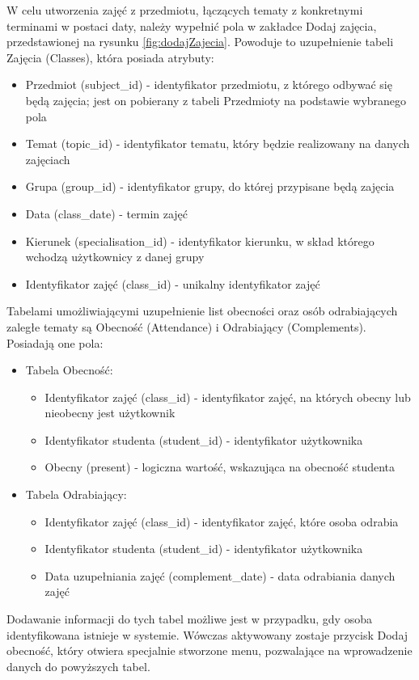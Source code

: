 W celu utworzenia zajęć z przedmiotu, łączących tematy z konkretnymi terminami w postaci daty, należy wypełnić pola w zakładce Dodaj zajęcia, przedstawionej na rysunku \ref{fig:dodajZajecia}. Powoduje to uzupełnienie tabeli Zajęcia (Classes), która posiada atrybuty:
\begin{itemize}
\item Przedmiot (subject\_id) - identyfikator przedmiotu, z którego odbywać się będą zajęcia; jest on pobierany z tabeli Przedmioty na podstawie wybranego pola
\item Temat (topic\_id) - identyfikator tematu, który będzie realizowany na danych zajęciach
\item Grupa (group\_id) - identyfikator grupy, do której przypisane będą zajęcia
\item Data (class\_date) - termin zajęć
\item Kierunek (specialisation\_id) - identyfikator kierunku, w skład którego wchodzą użytkownicy z danej grupy
\item Identyfikator zajęć (class\_id) - unikalny identyfikator zajęć
\end{itemize}
Tabelami umożliwiającymi uzupełnienie list obecności oraz osób odrabiających zaległe tematy są Obecność (Attendance) i Odrabiający (Complements). Posiadają one pola:
\begin{itemize}
\item Tabela Obecność:
\begin{itemize}
\item Identyfikator zajęć (class\_id) - identyfikator zajęć, na których obecny lub nieobecny jest użytkownik
\item Identyfikator studenta (student\_id) - identyfikator użytkownika
\item Obecny (present) - logiczna wartość, wskazująca na obecność studenta
\end{itemize}
\item Tabela Odrabiający:
\begin{itemize}
\item Identyfikator zajęć (class\_id) - identyfikator zajęć, które osoba odrabia
\item Identyfikator studenta (student\_id) - identyfikator użytkownika
\item Data uzupełniania zajęć (complement\_date) - data odrabiania danych zajęć
\end{itemize}
\end{itemize}

Dodawanie informacji do tych tabel możliwe jest w przypadku, gdy osoba identyfikowana istnieje w systemie. Wówczas aktywowany zostaje przycisk Dodaj obecność, który otwiera specjalnie stworzone menu, pozwalające na wprowadzenie danych do powyższych tabel.

